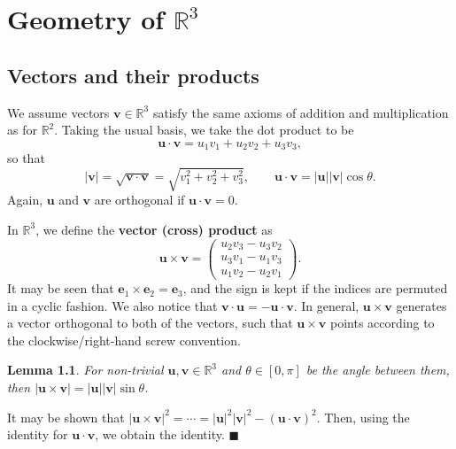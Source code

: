 \documentclass[letter-paper]{tufte-book}
\newtheorem{lemma}[theorem]{\color{pastel-blue}Lemma}
\newenvironment{proof}[1][Proof]{\begin{trivlist}
\item[\hskip \labelsep {\bfseries #1}]}{\end{trivlist}}
\newcommand{\eb}{\boldsymbol{e}}
\newcommand{\ub}{\boldsymbol{u}}
\newcommand{\vb}{\boldsymbol{v}}
\newcommand\Def[1]{\textbf{#1}}
\newcommand{\qed}{\hfill$\blacksquare$}
\begin{document}

\chapter{Geometry of $\mathbb{R}^3$}


\section{Vectors and their products}

We assume vectors $\vb\in\mathbb{R}^3$ satisfy the same axioms of addition and
multiplication as for $\mathbb{R}^2$. Taking the usual basis, we take the dot
product to be
\begin{equation}
	\ub\cdot\vb=u_1 v_1 + u_2 v_2 + u_3 v_3,
\end{equation}
so that
\begin{equation}
	|\vb|=\sqrt{\vb\cdot\vb}=\sqrt{v_1^2 + v_2^2 + v_3^2},\qquad
	\ub\cdot\vb=|\ub||\vb|\cos\theta.
\end{equation}
Again, $\ub$ and $\vb$ are orthogonal if $\ub\cdot\vb=0$.

In $\mathbb{R}^3$, we define the \Def{vector (cross) product} as
\begin{equation}
	\ub\times\vb=\begin{pmatrix}u_2 v_3 -u_3 v_2\\ u_3 v_1 - u_1 v_3\\
	u_1 v_2 - u_2 v_1\end{pmatrix}.
\end{equation}
It may be seen that $\eb_1\times\eb_2=\eb_3$, and the sign is kept if the
indices are permuted in a cyclic fashion. We also notice that
$\vb\cdot\ub=-\ub\cdot\vb$. In general, $\ub\times\vb$ generates a vector
orthogonal to both of the vectors, such that $\ub\times\vb$ points according to
the clockwise/right-hand screw convention.

\begin{lemma}
	For non-trivial $\ub,\vb\in\mathbb{R}^3$ and $\theta\in[0,\pi]$ be the angle
	between them, then $|\ub\times\vb|=|\ub||\vb|\sin\theta$.
\end{lemma}
\begin{proof}
	It may be shown that $|\ub\times\vb|^2=
	\cdots=|\ub|^2|\vb|^2-(\ub\cdot\vb)^2$. Then, using the identity for
	$\ub\cdot\vb$, we obtain the identity. \qed
\end{proof}
\end{document}
